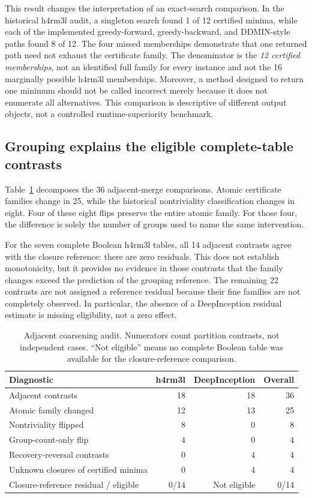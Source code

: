 \documentclass{article}
\begin{document}
This result changes the interpretation of an exact-search comparison. In
the historical h4rm3l audit, a singleton search found 1 of 12 certified minima,
while each of the implemented greedy-forward, greedy-backward, and
DDMIN-style paths found 8 of 12. The four missed memberships demonstrate
that one returned path need not exhaust the certificate family. The
denominator is the \emph{12 certified memberships}, not an identified full
family for every instance and not the 16 marginally possible h4rm3l
memberships. Moreover, a method designed to return one minimum should not be
called incorrect merely because it does not enumerate all alternatives. This
comparison is descriptive of different output objects, not a controlled
runtime-superiority benchmark.

\subsection{Grouping explains the eligible complete-table contrasts}

Table~\ref{tab:adjacent} decomposes the 36 adjacent-merge comparisons. Atomic
certificate families change in 25, while the historical nontriviality
classification changes in eight. Four of these eight flips preserve the
entire atomic family. For those four, the difference is solely the number
of groups used to name the same intervention.

For the seven complete Boolean h4rm3l tables, all 14 adjacent contrasts agree
with the closure reference: there are zero residuals. This does not establish
monotonicity, but it provides no evidence in those contrasts that the family
changes exceed the prediction of the grouping reference. The remaining
22 contrasts are not assigned a reference residual because their fine
families are not completely observed. In particular, the absence of a
DeepInception residual estimate is missing eligibility, not a zero effect.

\begin{table}[t]
\caption{Adjacent coarsening audit. Numerators count partition contrasts,
not independent cases. ``Not eligible'' means no complete Boolean table was
available for the closure-reference comparison.}
\label{tab:adjacent}
\centering
\small
\begin{tabular}{lrrr}
\toprule
Diagnostic & h4rm3l & DeepInception & Overall \\
\midrule
Adjacent contrasts & 18 & 18 & 36 \\
Atomic family changed & 12 & 13 & 25 \\
Nontriviality flipped & 8 & 0 & 8 \\
Group-count-only flip & 4 & 0 & 4 \\
Recovery-reversal contrasts & 0 & 4 & 4 \\
Unknown closures of certified minima & 0 & 4 & 4 \\
Closure-reference residual / eligible & 0/14 & Not eligible & 0/14 \\
\bottomrule
\end{tabular}
\end{table}
\end{document}
